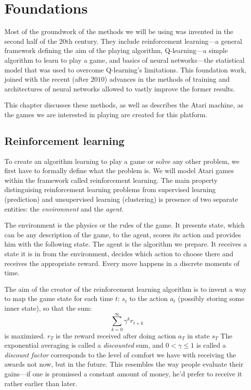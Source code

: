 \chapter{Foundations}\label{foundations}
Most of the groundwork of the methods we will be using was invented in the second half of the 20th century. They include reinforcement learning---a general framework defining the aim of the playing algorithm, Q-learning---a simple algorithm to learn to play a game, and basics of neural networks---the statistical model that was used to overcome Q-learning's limitations.
This foundation work, joined with the recent (after $2010$) advances in the methods of training and architectures of neural networks allowed to vastly improve the former results.

This chapter discusses these methods, as well as describes the Atari machine, as the games we are interested in playing are created for this platform.

\section{Reinforcement learning}
To create an algorithm learning to play a game or solve any other problem, we first have to formally define what the problem is. We will model Atari games within the framework called reinforcement learning. The main property distinguising reinforcement learning problems from supervised learning (prediction) and unsupervised learning (clustering) is presence of two separate entities: the \emph{environment} and the \emph{agent}.

The environment is the physics or the rules of the game. It presents state, which can be any description of the game, to the agent, scores its action and provides him with the following state.
The agent is the algorithm we prepare. It receives a state it is in from the environment, decides which action to choose there and receives the appropriate reward. Every move happens in a discrete moments of time.

The aim of the creator of the reinforcement learning algorithm is to invent a way to map the game state for each time $t$: $s_t$ to the action $a_t$ (possibly storing some inner state), so that the sum:
\begin{equation} \label{discounted-reward}
\sum_{k=0}^{\infty} \gamma^k r_{t + k}
\end{equation}
is maximized.  $r_T$ is the reward received after doing action $a_T$ in state $s_T$ The exponential averaging is called a \emph{discounted} sum, and $0 < \gamma \le 1$ is called a \emph{discount factor} corresponds to the level of comfort we have with receiving the awards not now, but in the future. This resembles the way people evaluate their gains---if one is promissed a constant amount of money, he'd prefer to receive it rather earlier than later.

